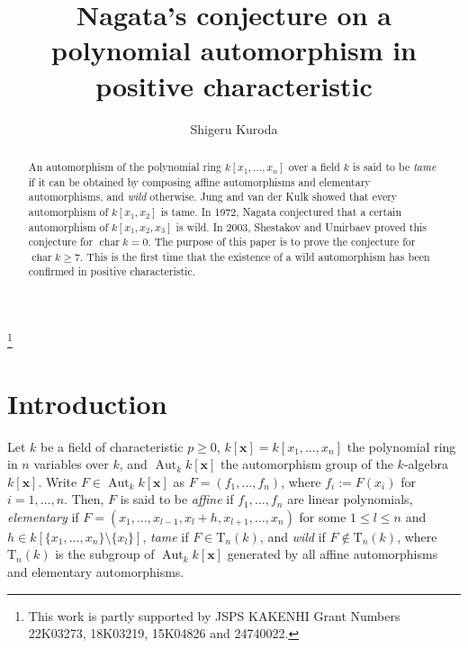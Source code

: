 \documentclass{amsart}
\theoremstyle{plain}
\theoremstyle{definition}
\newcommand{\sm}{\setminus}
\newcommand{\Aut }{\mathop{\mathrm{Aut}}\nolimits}
\newcommand{\T }{\mathrm{T}}
\newcommand{\ch }{\mathop{\mathrm{char}}\nolimits}
\newcommand{\x}{{\boldsymbol x}}
\newcommand{\kx}{k[\x]}
\begin{document}
\title[Nagata's conjecture in positive characteristic]{
Nagata's conjecture on a polynomial automorphism 
in positive characteristic}



\author{Shigeru Kuroda}
\address{Department of Mathematical Sciences\\
Tokyo Metropolitan University\\
1-1 Minami-Osawa, Hachioji, Tokyo, 192-0397, Japan}
\thanks{This work is partly supported by JSPS KAKENHI
Grant Numbers 22K03273, 18K03219, 15K04826 and 24740022.}




\maketitle 




\begin{abstract}
An automorphism of the polynomial ring $k[x_1,\ldots ,x_n]$ 
over a field $k$ is said to be {\it tame} if it can be 
obtained by composing 
affine automorphisms and elementary automorphisms, 
and {\it wild} otherwise. 
Jung and van der Kulk showed that 
every automorphism of $k[x_1,x_2]$ is tame. 
In 1972, 
Nagata conjectured that a certain automorphism of $k[x_1,x_2,x_3]$ 
is wild. 
In 2003, 
Shestakov and Umirbaev proved this conjecture for $\ch k=0$. 
The purpose of this paper is to 
prove the conjecture for $\ch k\ge 7$. 
This is the first time that the existence of 
a wild automorphism has been confirmed 
in positive characteristic. 
\end{abstract}



\section{Introduction}\label{sect:intro}
\setcounter{equation}{0}

Let $k$ be a field of characteristic $p\ge 0$, 
$\kx =k[x_1,\ldots ,x_n]$ the polynomial ring in $n$ variables over $k$, 
and $\Aut _k\kx $ the automorphism group of the $k$-algebra $\kx $. 
Write $F\in \Aut _k\kx $ as $F=(f_1,\ldots ,f_n)$, 
where $f_i:=F(x_i)$ for $i=1,\ldots ,n$. 
Then, 
$F$ is said to be {\it affine} if 
$f_1,\ldots ,f_n$ are linear polynomials, 
{\it elementary} if 
$F=(x_1,\ldots ,x_{l-1},x_l+h,x_{l+1},\ldots ,x_n)$ 
for some $1\le l\le n$ 
and $h\in k[\{ x_1,\ldots ,x_n\} \sm \{ x_l\} ]$, 
{\it tame} if $F\in \T _n(k)$, 
and {\it wild} if $F\not\in \T _n(k)$, 
where 
$\T _n(k)$ is the subgroup of $\Aut _k\kx $ 
generated by all affine automorphisms and elementary automorphisms. 
\end{document}
